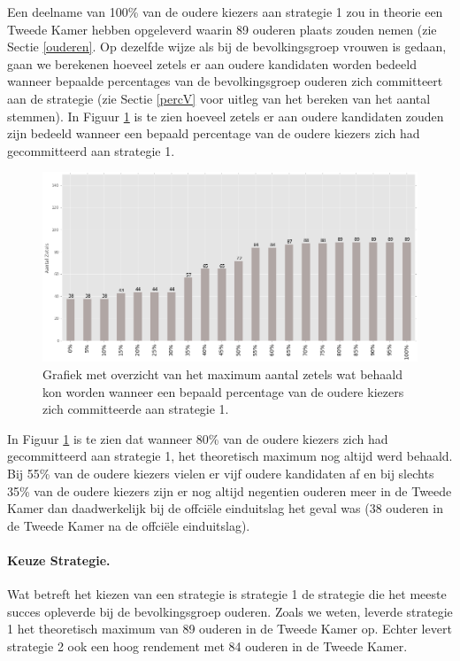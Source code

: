 \indent Een deelname van 100\% van de oudere kiezers aan strategie 1 zou in theorie een Tweede Kamer hebben opgeleverd waarin 89 ouderen plaats zouden nemen (zie Sectie \ref{ouderen}. Op dezelfde wijze als bij de bevolkingsgroep vrouwen is gedaan, gaan we berekenen hoeveel zetels er aan oudere kandidaten worden bedeeld wanneer bepaalde percentages van de bevolkingsgroep ouderen zich committeert aan de strategie (zie Sectie \ref{percV} voor uitleg van het bereken van het aantal stemmen). In Figuur \ref{fig:PerO} is te zien hoeveel zetels er aan oudere kandidaten zouden zijn bedeeld wanneer een bepaald percentage van de oudere kiezers zich had gecommitteerd aan strategie 1.  



\begin{figure}[H]
	\includegraphics[width=\linewidth]{percentages_van_ouderen.png}

			\caption{Grafiek met overzicht van het maximum aantal zetels wat behaald kon worden wanneer een bepaald percentage van de oudere kiezers zich committeerde aan strategie 1.}

\label{fig:PerO}
\end{figure}

In Figuur \ref{fig:PerO} is te zien dat wanneer 80\% van de oudere kiezers zich had gecommitteerd aan strategie 1, het theoretisch maximum nog altijd werd behaald. Bij 55\% van de oudere kiezers vielen er vijf oudere kandidaten af en bij slechts 35\% van de oudere kiezers zijn er nog altijd negentien ouderen meer in de Tweede Kamer dan daadwerkelijk bij de offci\"{e}le einduitslag het geval was (38 ouderen in de Tweede Kamer na de offci\"{e}le einduitslag). 

\paragraph{Keuze Strategie.}
Wat betreft het kiezen van een strategie is strategie 1 de strategie die het meeste succes opleverde bij de bevolkingsgroep ouderen. Zoals we weten, leverde strategie 1 het theoretisch maximum van 89 ouderen in de Tweede Kamer op. Echter levert strategie 2 ook een hoog rendement met 84 ouderen in de Tweede Kamer. 

